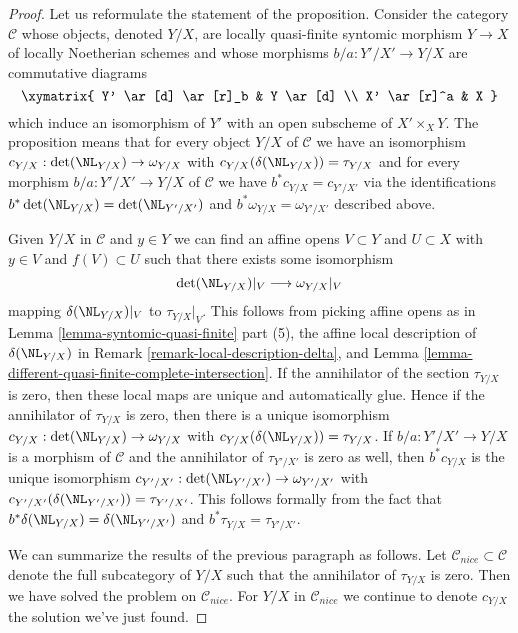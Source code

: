 \begin{proof}
Let us reformulate the statement of the proposition. Consider the category
$\mathcal{C}$ whose objects, denoted $Y/X$, are locally quasi-finite syntomic
morphism $Y \to X$ of locally Noetherian schemes and whose morphisms
$b/a : Y'/X' \to Y/X$ are commutative diagrams
$$
\xymatrix{
Y' \ar[d] \ar[r]_b & Y \ar[d] \\
X' \ar[r]^a & X
}
$$
which induce an isomorphism of $Y'$ with an open subscheme of
$X' \times_X Y$. The proposition means that for every object
$Y/X$ of $\mathcal{C}$ we have an isomorphism
$c_{Y/X} : \det(\NL_{Y/X}) \to \omega_{Y/X}$
with $c_{Y/X}(\delta(\NL_{Y/X})) = \tau_{Y/X}$
and for every morphism $b/a : Y'/X' \to Y/X$ of $\mathcal{C}$ we have
$b^*c_{Y/X} = c_{Y'/X'}$ via the identifications
$b^*\det(\NL_{Y/X}) = \det(\NL_{Y'/X'})$ and
$b^*\omega_{Y/X} = \omega_{Y'/X'}$ described above.

\medskip\noindent
Given $Y/X$ in $\mathcal{C}$ and $y \in Y$ we can find
an affine opens $V \subset Y$ and $U \subset X$ with
$y \in V$ and $f(V) \subset U$
such that there exists some isomorphism
$$
\det(\NL_{Y/X})|_V \longrightarrow \omega_{Y/X}|_V
$$
mapping $\delta(\NL_{Y/X})|_V$ to $\tau_{Y/X}|_V$. This follows
from picking affine opens as in
Lemma \ref{lemma-syntomic-quasi-finite} part (5), the affine
local description of $\delta(\NL_{Y/X})$ in
Remark \ref{remark-local-description-delta}, and
Lemma \ref{lemma-different-quasi-finite-complete-intersection}.
If the annihilator of the section $\tau_{Y/X}$ is zero, then
these local maps are unique and automatically glue. Hence if the annihilator
of $\tau_{Y/X}$ is zero, then there is a unique isomorphism
$c_{Y/X} : \det(\NL_{Y/X}) \to \omega_{Y/X}$ with
$c_{Y/X}(\delta(\NL_{Y/X})) = \tau_{Y/X}$.
If $b/a : Y'/X' \to Y/X$ is a morphism of $\mathcal{C}$
and the annihilator of $\tau_{Y'/X'}$ is zero as well,
then $b^*c_{Y/X}$ is the unique isomorphism
$c_{Y'/X'} : \det(\NL_{Y'/X'}) \to \omega_{Y'/X'}$ with
$c_{Y'/X'}(\delta(\NL_{Y'/X'})) = \tau_{Y'/X'}$.
This follows formally from the fact that
$b^*\delta(\NL_{Y/X}) = \delta(\NL_{Y'/X'})$ and
$b^*\tau_{Y/X} = \tau_{Y'/X'}$.

\medskip\noindent
We can summarize the results of the previous paragraph as follows.
Let $\mathcal{C}_{nice} \subset \mathcal{C}$ denote the
full subcategory of $Y/X$ such that the annihilator of
$\tau_{Y/X}$ is zero. Then we have solved the problem
on $\mathcal{C}_{nice}$. For $Y/X$ in $\mathcal{C}_{nice}$
we continue to denote $c_{Y/X}$ the solution we've just found.


\end{proof}
